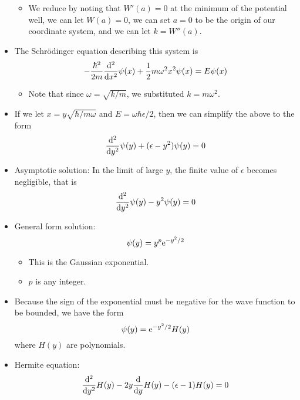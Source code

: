 \documentclass[../notes.tex]{subfiles}
\begin{document}
\begin{itemize}
    \begin{itemize}
        \item We reduce by noting that $W'(a)=0$ at the minimum of the potential well, we can let $W(a)=0$, we can set $a=0$ to be the origin of our coordinate system, and we can let $k=W''(a)$.
    \end{itemize}
    \item The Schr\"{o}dinger equation describing this system is
    \begin{equation*}
        -\frac{\hbar^2}{2m}\dv[2]{x}\psi(x)+\frac{1}{2}m\omega^2x^2\psi(x) = E\psi(x)
    \end{equation*}
    \begin{itemize}
        \item Note that since $\omega=\sqrt{k/m}$, we substituted $k=m\omega^2$.
    \end{itemize}
    \item If we let $x=y\sqrt{\hbar/m\omega}$ and $E=\omega\hbar\epsilon/2$, then we can simplify the above to the form
    \begin{equation*}
        \dv[2]{y}\psi(y)+(\epsilon-y^2)\psi(y) = 0
    \end{equation*}
    \item Asymptotic solution: In the limit of large $y$, the finite value of $\epsilon$ becomes negligible, that is
    \begin{equation*}
        \dv[2]{y}\psi(y)-y^2\psi(y) = 0
    \end{equation*}
    \item General form solution:
    \begin{equation*}
        \psi(y) = y^p\e[-y^2/2]
    \end{equation*}
    \begin{itemize}
        \item This is the Gaussian exponential.
        \item $p$ is any integer.
    \end{itemize}
    \item Because the sign of the exponential must be negative for the wave function to be bounded, we have the form
    \begin{equation*}
        \psi(y) = \e[-y^2/2]H(y)
    \end{equation*}
    where $H(y)$ are polynomials.
    \item Hermite equation:
    \begin{equation*}
        \dv[2]{y}H(y)-2y\dv{y}H(y)-(\epsilon-1)H(y) = 0
    \end{equation*}

\end{itemize}
\end{document}
